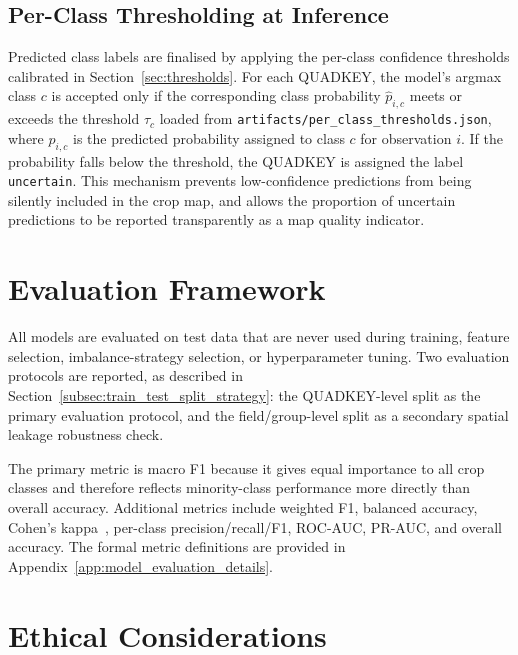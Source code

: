 \subsection{Per-Class Thresholding at Inference}
\label{subsec:inference_threshold}

Predicted class labels are finalised by applying the per-class confidence
thresholds calibrated in Section~\ref{sec:thresholds}. For each QUADKEY,
the model's argmax class $c$ is accepted only if the corresponding class
probability $\hat{p}_{i,c}$ meets or exceeds the threshold $\tau_c$
loaded from \texttt{artifacts/per\_class\_thresholds.json}, where
$\hat{p}_{i,c}$ is the predicted probability assigned to class $c$ for
observation $i$. If the
probability falls below the threshold, the QUADKEY is assigned the label
\texttt{uncertain}. This mechanism prevents low-confidence predictions
from being silently included in the crop map, and allows the proportion
of uncertain predictions to be reported transparently as a map quality
indicator.


\section{Evaluation Framework}
\label{sec:evaluation}

All models are evaluated on test data that are never used during training,
feature selection, imbalance-strategy selection, or hyperparameter tuning.
Two evaluation protocols are reported, as described in
Section~\ref{subsec:train_test_split_strategy}: the QUADKEY-level split as
the primary evaluation protocol, and the field/group-level split as a
secondary spatial leakage robustness check.

The primary metric is macro F1 because it gives equal importance to all
crop classes and therefore reflects minority-class performance more
directly than overall accuracy. Additional metrics include weighted F1,
balanced accuracy, Cohen's kappa~\cite{cohen1960kappa}, per-class
precision/recall/F1, ROC-AUC, PR-AUC, and overall accuracy. The formal
metric definitions are provided in Appendix~\ref{app:model_evaluation_details}.


\section{Ethical Considerations}
\label{sec:ethics}


